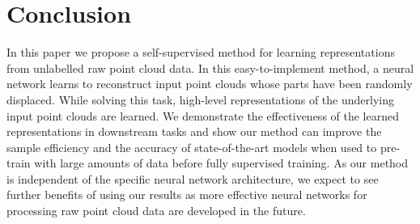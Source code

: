 \documentclass{article}
\begin{document}
\section{Conclusion}

In this paper we propose a self-supervised method for learning representations from unlabelled raw point cloud data. In this easy-to-implement method, a neural network learns to reconstruct input point clouds whose parts have been randomly displaced. While solving this task, high-level representations of the underlying input point clouds are learned. We demonstrate the effectiveness of the learned representations in downstream tasks and show our method can improve the sample efficiency and the accuracy of state-of-the-art models when used to pre-train with large amounts of data before fully supervised training. As our method is independent of the specific neural network architecture, we expect to see further benefits of using our results as more effective neural networks for processing raw point cloud data are developed in the future.


\end{document}
